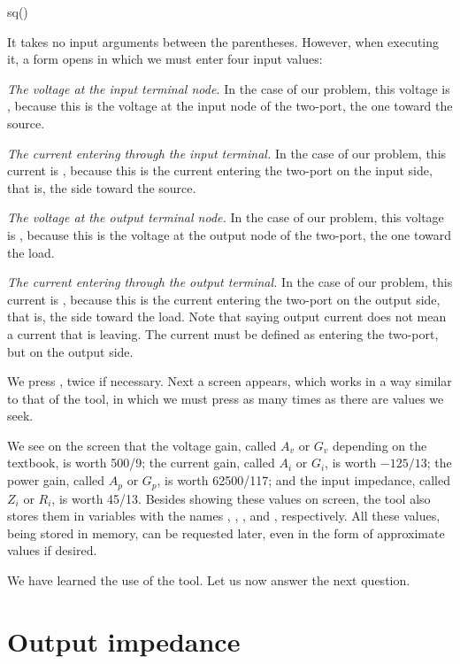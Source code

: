 \begin{entry}
sq\gain()
\end{entry}

It takes no input arguments between the parentheses. However, when
executing it, a form opens in which we must enter four input values:

\emph{The voltage at the input terminal node.} In the case of our
problem, this voltage is , because this is the voltage at
the input node of the two-port, the one toward the source.

\emph{The current entering through the input terminal.} In the case
of our problem, this current is , because this is the
current entering the two-port on the input side, that is, the side
toward the source.

\emph{The voltage at the output terminal node.} In the case of our
problem, this voltage is , because this is the voltage at
the output node of the two-port, the one toward the load.

\emph{The current entering through the output terminal.} In the case
of our problem, this current is , because this is the
current entering the two-port on the output side, that is, the side
toward the load. Note that saying output current does not mean a
current that is leaving. The current must be defined as entering the
two-port, but on the output side.

We press , twice if necessary. Next a screen appears,
which works in a way similar to that of the  tool, in
which we must press  as many times as there are values we
seek.

We see on the screen that the voltage gain, called $A_v$ or $G_v$
depending on the textbook, is worth 500/9; the current gain, called
$A_i$ or $G_i$, is worth $-125/13$; the power gain, called $A_p$ or
$G_p$, is worth 62500/117; and the input impedance, called $Z_i$ or
$R_i$, is worth 45/13. Besides showing these values on screen, the
tool also stores them in variables with the names ,
, , and , respectively. All these values,
being stored in memory, can be requested later, even in the form of
approximate values if desired.

We have learned the use of the  tool. Let us now answer
the next question.

\section{Output impedance}

